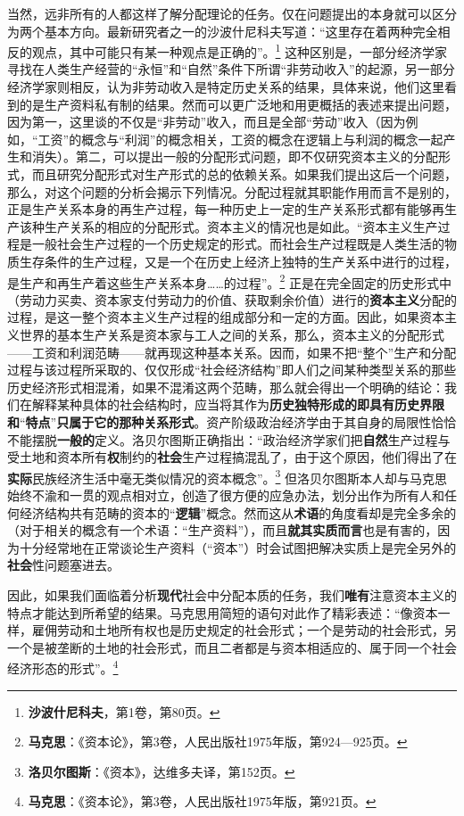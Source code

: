 \documentclass[fontset=fandol, a4paper, 12pt, openright]{ctexbook}
\begin{document}
当然，远非所有的人都这样了解分配理论的任务。仅在问题提出的本身就可以区分为两个基本方向。最新研究者之一的沙波什尼科夫写道：“这里存在着两种完全相反的观点，其中可能只有某一种观点是正确的”。\footnote{\textbf{沙波什尼科夫}，第1卷，第80页。} 这种区别是，一部分经济学家寻找在人类生产经营的“永恒”和“自然”条件下所谓“非劳动收入”的起源，另一部分经济学家则相反，认为非劳动收入是特定历史关系的结果，具体来说，他们这里看到的是生产资料私有制的结果。然而可以更广泛地和用更概括的表述来提出问题，因为第一，这里谈的不仅是“非劳动”收入，而且是全部“劳动”收入（因为例如，“工资”的概念与“利润”的概念相关，工资的概念在逻辑上与利润的概念一起产生和消失）。第二，可以提出一般的分配形式问题，即不仅研究资本主义的分配形式，而且研究分配形式对生产形式的总的依赖关系。如果我们提出这后一个问题，那么，对这个问题的分析会揭示下列情况。分配过程就其职能作用而言不是别的，正是生产关系本身的再生产过程，每一种历史上一定的生产关系形式都有能够再生产该种生产关系的相应的分配形式。资本主义的情况也是如此。“资本主义生产过程是一般社会生产过程的一个历史规定的形式。而社会生产过程既是人类生活的物质生存条件的生产过程，又是一个在历史上经济上独特的生产关系中进行的过程，是生产和再生产着这些生产关系本身……的过程”。\footnote{\textbf{马克思}：《资本论》，第3卷，人民出版社1975年版，第924—925页。} 正是在完全固定的历史形式中（劳动力买卖、资本家支付劳动力的价值、获取剩余价值）进行的\textbf{资本主义}分配的过程，是这一整个资本主义生产过程的组成部分和一定的方面。因此，如果资本主义世界的基本生产关系是资本家与工人之间的关系，那么，资本主义的分配形式——工资和利润范畴——就再现这种基本关系。因而，如果不把“整个”生产和分配过程与该过程所采取的、仅仅形成“社会经济结构”即人们之间某种类型关系的那些历史经济形式相混淆，如果不混淆这两个范畴，那么就会得出一个明确的结论：我们在解释某种具体的社会结构时，应当将其作为\textbf{历史独特形成的即具有历史界限和}“\textbf{特点}”\textbf{只属于它的那种关系形式}。资产阶级政治经济学由于其自身的局限性恰恰不能摆脱\textbf{一般的}定义。洛贝尔图斯正确指出：“政治经济学家们把\textbf{自然}生产过程与受土地和资本所有\textbf{权}制约的\textbf{社会}生产过程搞混乱了，由于这个原因，他们得出了在\textbf{实际}民族经济生活中毫无类似情况的资本概念”。\footnote{\textbf{洛贝尔图斯}：《资本》，达维多夫译，第152页。} 但洛贝尔图斯本人却与马克思始终不渝和一贯的观点相对立，创造了很方便的应急办法，划分出作为所有人和任何经济结构共有范畴的资本的“\textbf{逻辑}”概念。然而这从\textbf{术语}的角度看却是完全多余的（对于相关的概念有一个术语：“生产资料”），而且\textbf{就其实质而言}也是有害的，因为十分经常地在正常谈论生产资料（“资本”）时会试图把解决实质上是完全另外的\textbf{社会}性问题塞进去。

因此，如果我们面临着分析\textbf{现代}社会中分配本质的任务，我们\textbf{唯有}注意资本主义的特点才能达到所希望的结果。马克思用简短的语句对此作了精彩表述：“像资本一样，雇佣劳动和土地所有权也是历史规定的社会形式；一个是劳动的社会形式，另一个是被垄断的土地的社会形式，而且二者都是与资本相适应的、属于同一个社会经济形态的形式”。\footnote{\textbf{马克思}：《资本论》，第3卷，人民出版社1975年版，第921页。}
\end{document}
